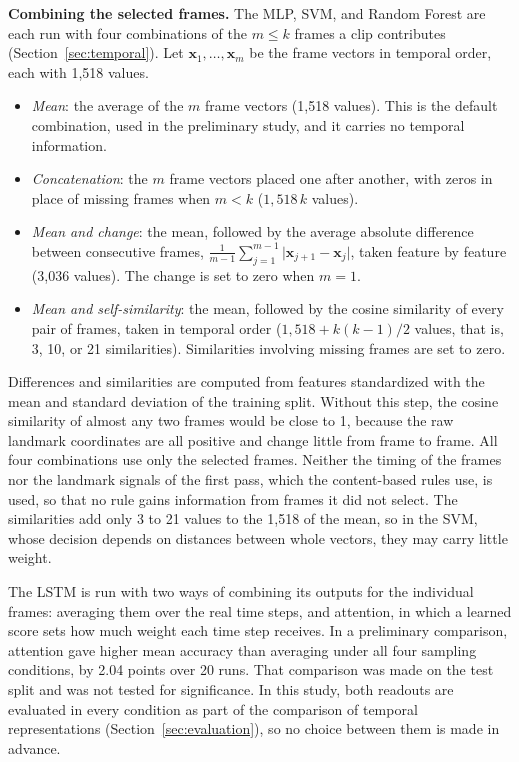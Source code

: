 \textbf{Combining the selected frames.} The MLP, SVM, and Random Forest are each run with four combinations of the $m \le k$ frames a clip contributes (Section~\ref{sec:temporal}). Let $\mathbf{x}_1, \dots, \mathbf{x}_m$ be the frame vectors in temporal order, each with 1,518 values.
\begin{itemize}
   \item \emph{Mean}: the average of the $m$ frame vectors (1,518 values). This is the default combination, used in the preliminary study, and it carries no temporal information.
   \item \emph{Concatenation}: the $m$ frame vectors placed one after another, with zeros in place of missing frames when $m < k$ ($1{,}518\,k$ values).
   \item \emph{Mean and change}: the mean, followed by the average absolute difference between consecutive frames, $\frac{1}{m-1}\sum_{j=1}^{m-1} \lvert \mathbf{x}_{j+1} - \mathbf{x}_j \rvert$, taken feature by feature (3,036 values). The change is set to zero when $m = 1$.
   \item \emph{Mean and self-similarity}: the mean, followed by the cosine similarity of every pair of frames, taken in temporal order ($1{,}518 + k(k-1)/2$ values, that is, 3, 10, or 21 similarities). Similarities involving missing frames are set to zero.
\end{itemize}
Differences and similarities are computed from features standardized with the mean and standard deviation of the training split. Without this step, the cosine similarity of almost any two frames would be close to 1, because the raw landmark coordinates are all positive and change little from frame to frame. All four combinations use only the selected frames. Neither the timing of the frames nor the landmark signals of the first pass, which the content-based rules use, is used, so that no rule gains information from frames it did not select. The similarities add only 3 to 21 values to the 1,518 of the mean, so in the SVM, whose decision depends on distances between whole vectors, they may carry little weight.

The LSTM is run with two ways of combining its outputs for the individual frames: averaging them over the real time steps, and attention, in which a learned score sets how much weight each time step receives. In a preliminary comparison, attention gave higher mean accuracy than averaging under all four sampling conditions, by 2.04 points over 20 runs. That comparison was made on the test split and was not tested for significance. In this study, both readouts are evaluated in every condition as part of the comparison of temporal representations (Section~\ref{sec:evaluation}), so no choice between them is made in advance.

